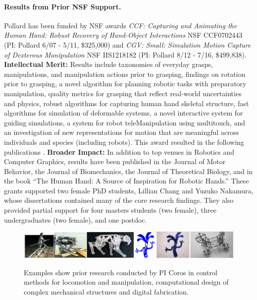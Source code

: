 \paragraph{Results from Prior NSF Support.}
Pollard has been funded by NSF awards \emph{CCF: Capturing and Animating the Human Hand: Robust Recovery of Hand-Object Interactions} NSF CCF0702443 (PI:  Pollard  6/07 - 5/11, \$325,000)  and \emph{CGV: Small: Simulation Motion Capture of Dexterous Manipulation} NSF IIS1218182 (PI:  Pollard  8/12 - 7/16, \$499,838).
{\bf Intellectual Merit:}  Results include taxonomies of everyday grasps, manipulations, and manipulation actions prior to grasping, findings on rotation prior to grasping, a novel algorithm for planning robotic tasks with preparatory manipulation, quality metrics for grasping that reflect real-world uncertainties and physics, robust
algorithms for capturing human hand skeletal structure, fast algorithms for simulation of deformable systems, a novel interactive system for guiding
simulations, a system for robot teleManipulation using multitouch, and an investigation of new
representations for motion that are meaningful across 
individuals and species (including robots).  This award resulted in the following
publications
\cite{liu2016annotating,chung2015quadratic,Liu2014,illing2014changing,kim2013physically,Toh:2012,Chang:2014,Gatesy:2011,Kappler:2012,Kim:ToG11,Kim:CGA11,Koonjul:ICRA11,Chang:JMB10,Chang:ICRA10,Kappler:Humanoids10,Chang:2009,Chang:twoAxis08,Chang:Humanoids08}.
{\bf Broader Impact:}  In addition to top venues in Robotics and Computer Graphics, results
have been published in the Journal of Motor Behavior, the Journal of
Biomechanics, the Journal of Theoretical Biology, and
in the book ``The Human Hand: A Source of Inspiration for
Robotic Hands.''  These grants supported two female PhD students, Lillian Chang and Yuzuko Nakamura,
whose dissertations contained many of the core research findings.  They also provided partial support for four masters students (two female), three undergraduates (two female),
and one postdoc.

\begin{figure}
\begin{center}
{\includegraphics[width=\linewidth]{./figs/corosPrior}}
\end{center}
\vspace*{-0.2in}
\caption{\small Examples show prior research conducted by PI Coros in control methods for locomotion and manipulation, computational design of complex mechanical structures and digital fabrication.}
\label{fig:corosPrior}
\end{figure}

